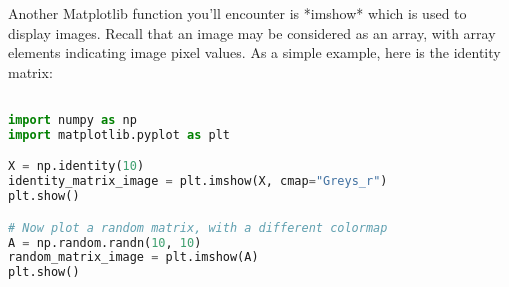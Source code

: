 \documentclass[11pt, a4paper]{article}
\begin{document}
Another Matplotlib function you'll encounter is *imshow* which is used to display images. Recall that an image may be considered as an array, with array elements indicating image pixel values. As a simple example, here is the identity matrix:


\begin{lstlisting}[language=Python]

import numpy as np
import matplotlib.pyplot as plt

X = np.identity(10)
identity_matrix_image = plt.imshow(X, cmap="Greys_r")
plt.show()

# Now plot a random matrix, with a different colormap
A = np.random.randn(10, 10)
random_matrix_image = plt.imshow(A)
plt.show()
\end{lstlisting}
\end{document}
